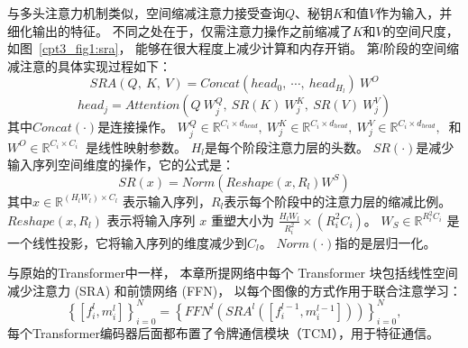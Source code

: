 与多头注意力机制类似，空间缩减注意力接受查询$Q$、秘钥$K$和值$V$作为输入，并细化输出的特征。
不同之处在于，仅需注意力操作之前缩减了$K$和$V$的空间尺度，如图~\ref{cpt3_fig1:sra}，
能够在很大程度上减少计算和内存开销。
第$l$阶段的空间缩减注意的具体实现过程如下：
%
%
%
%
\begin{equation}
	SRA(Q,~K,~V) = Concat(head_{0},~ \cdots,~ head_{H_{l}})~W^{O}
\end{equation}
%
%
\begin{equation}
	head_{j} = Attention(Q~W_{j}^{Q}, ~ SR(K)~W_{j}^{K},~ SR(V)~W_{j}^{V})
\end{equation}
%
%
%
其中$Concat(\cdot)$是连接操作。
$W_{j}^{Q} \in \mathbb{R}^{C_{i} \times d_{head}},~
W_{j}^{K} \in \mathbb{R}^{C_{i} \times d_{head}},~
W_{j}^{V} \in \mathbb{R}^{C_{i} \times d_{head}},~$
和
$W^{O} \in \mathbb{R}^{C_{i} \times C_{i}}~$
是线性映射参数。
$H_{l}$是每个阶段注意力层的头数。
$SR(\cdot)$是减少输入序列空间维度的操作，它的公式是：
%
%
%
\begin{equation}
	SR(x) = Norm(Reshape(x, R_{l})W^{S})
\end{equation}
%
%
其中$x \in \mathbb{R}^{(H_{l}W_{l}) \times C_{l}} $
表示输入序列，$R_{l}$表示每个阶段中的注意力层的缩减比例。
$Reshape(x, R_{l})$ 表示将输入序列 $x$ 重塑大小为
$\frac{H_{l}W_{l}}{R_{i}^{2}} \times (R_{i}^{2}C_{i})$。
$W_{S} \in \mathbb{R}^{R_{i}^{2}C_{i}}$
是一个线性投影，它将输入序列的维度减少到$C_{l}$。
$Norm(\cdot)$指的是层归一化。
%
%
\par
%
%
与原始的Transformer中一样，
本章所提网络中每个 Transformer 块包括线性空间减少注意力 (SRA) 和前馈网络 (FFN)，
以每个图像的方式作用于联合注意学习：
\begin{equation}
	\left \{ [f_{i}^{l}, m_{i}^{l}]\right \}_{i=0}^{N} = \left \{ FFN^{l} \left  ( SRA^{l} \left ( [f_{i}^{l-1}, m_{i}^{l-1}]\right )\right )\right \}_{i=0}^{N},
\end{equation}
每个Transformer编码器后面都布置了令牌通信模块（TCM），用于特征通信。 













